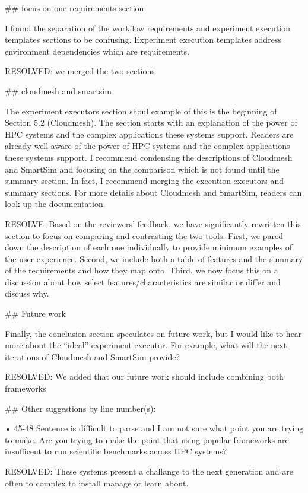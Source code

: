 ## focus on one requirements section

I found the separation of the workflow requirements and experiment execution templates sections to be confusing. Experiment execution templates address environment dependencies which are requirements.

    RESOLVED: we merged the two sections

## cloudmesh and smartsim

The experiment executors section shoul
example of this is the beginning of Section 5.2 (Cloudmesh). The section starts with an explanation of the power of HPC systems and the complex applications these systems support. Readers are already well aware of the power of HPC systems and the complex applications these systems support. I recommend condensing the descriptions of Cloudmesh and SmartSim and focusing on the comparison which is not found until the summary section. In fact, I recommend merging the execution executors and summary sections. For more details about Cloudmesh and SmartSim, readers can look up the documentation.
    
    RESOLVE: Based on the reviewers' feedback, we have significantly rewritten this section to focus on comparing and contrasting the two tools. First, we pared down the description of each one individually to provide minimum examples of the user experience. Second, we include both a table of features and the summary of the requirements and how they map onto. Third, we now focus this on a discussion about how select features/characteristics are similar or differ and discuss why.

## Future work

Finally, the conclusion section speculates on future work, but I would like to hear more about the “ideal” experiment executor. For example, what will the next iterations of Cloudmesh and SmartSim provide?

    RESOLVED: We added that our future work should include combining both frameworks

## Other suggestions by line number(s):

• 45-48 Sentence is difficult to parse and I am not sure what point you are trying to make.
Are you trying to make the point that using popular frameworks are insufficent to run
scientific benchmarks across HPC systems?

    RESOLVED: These systems present a challange to the next generation and are often to complex to install manage or learn about. 

